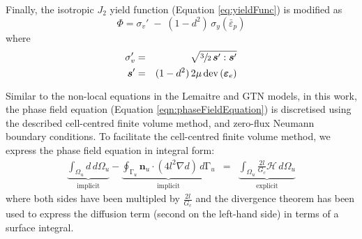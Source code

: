 \documentclass[sn-mathphys,Numbered]{sn-jnl}%
\newcommand{\bb}{\boldsymbol}
\begin{document}
Finally, the isotropic $J_2$ yield function (Equation \ref{eq:yieldFunc}) is modified as \citep{borden_phase-field_2016}
\begin{equation}
	\Phi = \sigma_{v}' \; - \; (1 - d^2) \, \sigma_y\left(\bar{\varepsilon}_p \right)
\end{equation}
where 
\begin{eqnarray}
	\sigma_{v}' &=& \sqrt{\sfrac{3}{2} \, \bb{s}' : \bb{s}'} \\
	\boldsymbol{s}' &=& (1 - d^2)\, 2 \mu \, \text{dev}\left(\bb{\varepsilon}_{e}\right)
\end{eqnarray}

Similar to the non-local equations in the Lemaitre and GTN models, in this work, the phase field equation (Equation \ref{eqn:phaseFieldEquation}) is discretised using the described cell-centred finite volume method, and zero-flux Neumann boundary conditions.
To facilitate the cell-centred finite volume method, we express the phase field equation in integral form:
\begin{eqnarray}
	\underbrace{ \int_{\Omega_u} d \, d \Omega_u }_{\text {implicit}}
	- \underbrace{ \oint_{\mathrm{\Gamma}_u}  \bb{n}_u \cdot \left(  4 l^2 \nabla d \right) \,  d\mathrm{\Gamma}_u }_{\text {implicit}}
	 &=&  \underbrace{ \int_{\Omega_u} \frac{2l}{G_c} \mathcal{H} \, d \Omega_u }_{\text {explicit}}
\end{eqnarray}
where both sides have been multipled by $\frac{2l}{G_c}$ and the divergence theorem has been used to express the diffusion term (second on the left-hand side) in terms of a surface integral.
\end{document}
